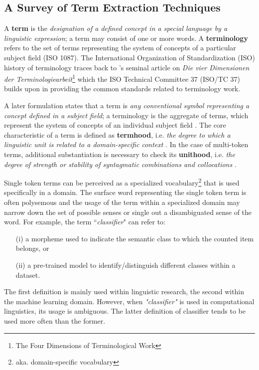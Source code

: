 \subsection{A Survey of Term Extraction Techniques} \label{sec:terminology}

A \textbf{term} is the \emph{designation of a defined concept in a special language by a linguistic expression}; a term may consist of one or more words. A \textbf{terminology} refers to the set of terms representing the system of concepts of a particular subject field (ISO 1087). The International Organization of Standardization (ISO) history of terminology traces back to \citeauthor{wuster1969}'s \citeyearpar{wuster1969} seminal article on \emph{Die vier Dimensionen der Terminologiearbeit}\footnote{The Four Dimensions of Terminological Work} which the ISO Technical Committee 37 (ISO/TC 37) builds upon in providing the common standards related to terminology work. 

A later formulation states that a term is \emph{any conventional symbol representing a concept defined in a subject field}; a terminology is the aggregate of terms, which represent the system of concepts of an individual subject field \citep{felber1984}. The core characteristic of a term is defined as \textbf{termhood}, i.e. \emph{the degree to which a linguistic unit is related to a domain-specific context} \citep{kageura1996}. In the case of multi-token terms, additional substantiation is necessary to check its \textbf{unithood}, i.e. \emph{the degree of strength or stability of syntagmatic combinations and collocations} \citep{kageura1996}.

Single token terms can be perceived as a specialized vocabulary\footnote{aka. domain-specific vocabulary} that is used specifically in a domain. The surface word representing the single token term is often polysemous and the usage of the term within a specialized domain may narrow down the set of possible senses or single out a disambiguated sense of the word. For example, the term ``\emph{classifier}" can refer to:

\begin{itemize}[nosep]
\item[(i)] a morpheme used to indicate the semantic class to which the counted item belongs, or 
\item[(ii)] a pre-trained model to identify/distinguish different classes within a dataset. 
\end{itemize}
The first definition is mainly used within linguistic research, the second within the machine learning domain. However, when \textit{"classifier"} is used in computational linguistics, its usage is ambiguous. The latter definition of classifier tends to be used more often than the former. 

